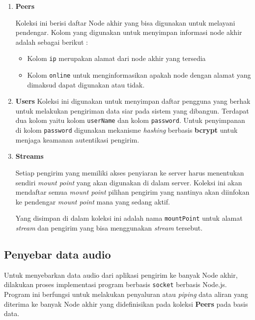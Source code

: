 \begin{enumerate}
    \item \textbf{Peers} 
    
    Koleksi ini berisi daftar Node akhir yang bisa digunakan untuk melayani pendengar. Kolom yang digunakan untuk menyimpan informasi node akhir adalah sebagai berikut :
    
    \begin{itemize}
    \item Kolom \texttt{ip} merupakan alamat dari node akhir yang tersedia
    \item Kolom \texttt{online} untuk menginformasikan apakah node dengan alamat yang dimaksud dapat digunakan atau tidak.
    \end{itemize}
    
    \item \textbf{Users}
    Koleksi ini digunakan untuk menyimpan daftar pengguna yang berhak untuk melakukan pengiriman data siar pada sistem yang dibangun. Terdapat dua kolom yaitu kolom \texttt{userName} dan kolom \texttt{password}. Untuk penyimpanan di kolom \texttt{password} digunakan mekanisme \emph{hashing} berbasis \textbf{bcrypt} untuk menjaga keamanan autentikasi pengirim.
    
    \item \textbf{Streams}
    
    Setiap pengirim yang memiliki akses penyiaran ke server harus menentukan sendiri \textit{mount point} yang akan digunakan di dalam server. Koleksi ini akan mendaftar semua \textit{mount point} pilihan pengirim yang nantinya akan diinfokan ke pendengar \textit{mount point} mana yang sedang aktif. 
    
    Yang disimpan di dalam koleksi ini adalah nama \texttt{mountPoint} untuk alamat \textit{stream} dan pengirim yang bisa menggunakan \textit{stream} tersebut.
\end{enumerate}

\subsection{Penyebar data audio}

Untuk menyebarkan data audio dari aplikasi pengirim ke banyak Node akhir, dilakukan proses implementasi program berbasis \texttt{socket} berbasis Node.js. Program ini berfungsi untuk melakukan penyaluran atau \emph{piping} data aliran yang diterima ke banyak Node akhir yang didefinisikan pada koleksi \textbf{Peers} pada basis data. 

